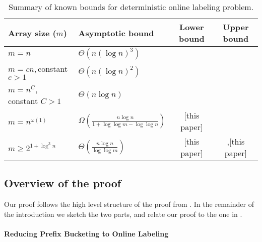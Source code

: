 \documentclass[unicode,review]{siamart1116}
\newcommand{\PTheta}[1]{\Theta\!\left(#1\right)}
\numberwithin{theorem}{section}
\begin{document}
\begin{table}
\centering
\caption{Summary of known bounds for deterministic online labeling problem.} \label{tab-1}
\begin{tabular}{l l c c}
	\toprule 
	Array size ($m$) &
	Asymptotic bound &
	Lower bound &
	Upper bound
	\\ \toprule

	$m = n$ &
	$\PTheta{n (\log n)^3}$ &
	\cite{BKS} &
	\cite{Zhang}
	\\ \midrule

	$m = cn$,\,constant $c>1$ &
	$\PTheta{n (\log n)^2}$ &
	\cite{BKS} &
	\cite{Itaietal}
	\\ \midrule

%	
	
	$m = n ^ {C}$,\, constant $C>1$ &
	$\PTheta{n \log n}$ &
	\cite{DSZ04} &
	\cite{Itaietal}
	\\ \midrule
	
	$m = n ^ {\omega(1)}$ &
	$\Omega{\left(\frac{n \log n}{1 + \log \log m - \log \log n}\right)}$ &
	[this paper] & 
\\ \midrule
	
	$m \geq 2^{1+\log^3 n}$ &
	$\PTheta{\frac{n \log n}{\log \log m}}$ &
	[this paper] & \cite{BKS},[this paper]
	\\ \bottomrule
\end{tabular}
\label{table:table_bounds}
\end{table}

\subsection{Overview of the proof}
\label{s-1.1}

Our proof follows the high level structure of the proof from \cite{DSZ04}.  In the remainder of the introduction we sketch the two
parts, and relate our proof to the one in \cite{DSZ04}.

\paragraph{Reducing Prefix Bucketing to Online Labeling}
\end{document}
